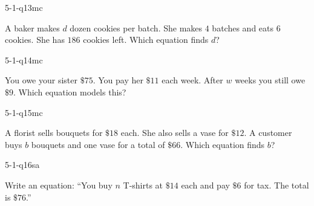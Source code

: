 \begin{practiceQuestion}{5-1-q13}{mc}
\begin{questionText}
A baker makes $d$ dozen cookies per batch. She makes $4$ batches and eats $6$ cookies. She has $186$ cookies left. Which equation finds $d$?
\end{questionText}
\end{practiceQuestion}

\begin{practiceQuestion}{5-1-q14}{mc}
\begin{questionText}
You owe your sister $\$75$. You pay her $\$11$ each week. After $w$ weeks you still owe $\$9$. Which equation models this?
\end{questionText}
\end{practiceQuestion}

\begin{practiceQuestion}{5-1-q15}{mc}
\begin{questionText}
A florist sells bouquets for $\$18$ each. She also sells a vase for $\$12$. A customer buys $b$ bouquets and one vase for a total of $\$66$. Which equation finds $b$?
\end{questionText}
\end{practiceQuestion}


\begin{practiceQuestion}{5-1-q16}{sa}
\begin{questionText}
Write an equation: ``You buy $n$ T-shirts at $\$14$ each and pay $\$6$ for tax. The total is $\$76$.''
\end{questionText}
\end{practiceQuestion}

